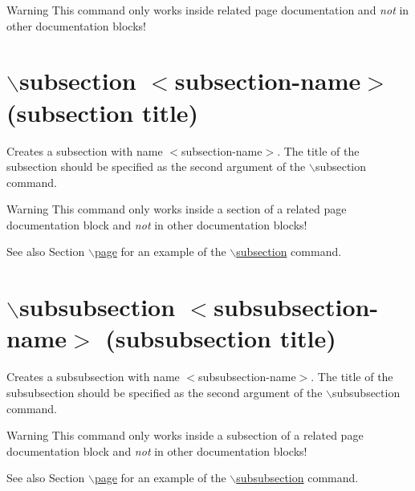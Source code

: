 \begin{DoxyWarning}{Warning}
This command only works inside related page documentation and {\itshape not\/} in other documentation blocks!
\end{DoxyWarning}


 \hypertarget{commands_cmdsubsection}{}\section{$\backslash$subsection $<$subsection-\/name$>$ (subsection title)}\label{commands_cmdsubsection}
 Creates a subsection with name $<$subsection-\/name$>$. The title of the subsection should be specified as the second argument of the $\backslash$subsection command.

\begin{DoxyWarning}{Warning}
This command only works inside a section of a related page documentation block and {\itshape not\/} in other documentation blocks!
\end{DoxyWarning}
\begin{DoxySeeAlso}{See also}
Section \hyperlink{commands_cmdpage}{$\backslash$page} for an example of the \hyperlink{commands_cmdsubsection}{$\backslash$subsection} command.
\end{DoxySeeAlso}


 \hypertarget{commands_cmdsubsubsection}{}\section{$\backslash$subsubsection $<$subsubsection-\/name$>$ (subsubsection title)}\label{commands_cmdsubsubsection}
 Creates a subsubsection with name $<$subsubsection-\/name$>$. The title of the subsubsection should be specified as the second argument of the $\backslash$subsubsection command.

\begin{DoxyWarning}{Warning}
This command only works inside a subsection of a related page documentation block and {\itshape not\/} in other documentation blocks!
\end{DoxyWarning}
\begin{DoxySeeAlso}{See also}
Section \hyperlink{commands_cmdpage}{$\backslash$page} for an example of the \hyperlink{commands_cmdsubsubsection}{$\backslash$subsubsection} command.
\end{DoxySeeAlso}


